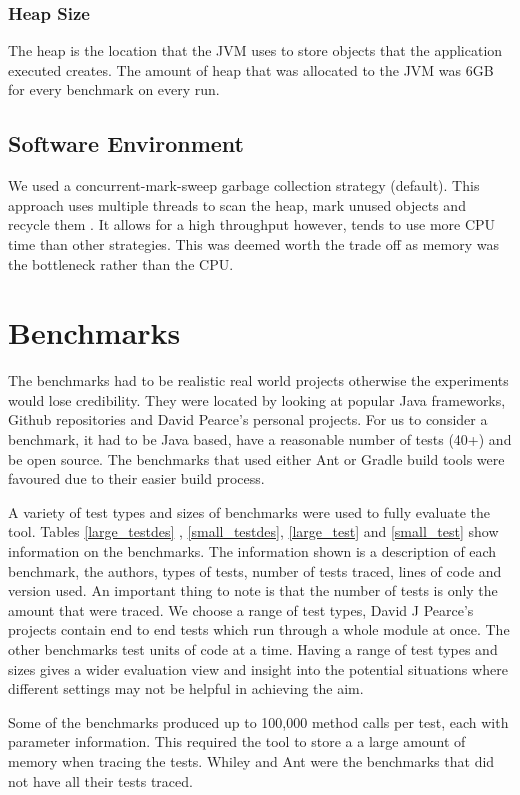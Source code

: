 \subsubsection{Heap Size}
The heap is the location that the JVM uses to store objects that the  application executed creates. The amount of heap that was allocated to the JVM was 6GB for every benchmark on every run.

\subsection{Software Environment}

We used a concurrent-mark-sweep garbage collection strategy (default). This approach uses multiple threads to scan the heap, mark unused objects and recycle them \cite{oracle2015}. It allows for a high throughput however, tends to use more CPU time than other strategies. This was deemed worth the trade off as memory was the bottleneck rather than the CPU.

\section{Benchmarks}
\label{S:bench}
The benchmarks had to be realistic real world projects otherwise the experiments would lose credibility. They were located by looking at popular Java frameworks, Github repositories and David Pearce's personal projects. For us to consider a benchmark, it had to be Java based, have a reasonable number of tests (40+) and be open source. The benchmarks that used either Ant or Gradle build tools were favoured due to their easier build process.

A variety of test types and sizes of benchmarks were used to fully evaluate the tool. Tables \ref{large_testdes} , \ref{small_testdes}, \ref{large_test} and \ref{small_test} show information on the benchmarks. The information shown is a description of each benchmark, the authors, types of tests, number of tests traced, lines of code and version used. An important thing to note is that the number of tests is only the amount that were traced. We choose a range of test types, David J Pearce's projects contain end to end tests which run through a whole module at once. The other benchmarks test units of code at a time. Having a range of test types and sizes gives a wider evaluation view and insight into the potential situations where different settings may not be helpful in achieving the aim.

Some of the benchmarks produced up to 100,000 method calls per test, each with parameter information. This required the tool to store a a large amount of memory when tracing the tests. Whiley and Ant were the benchmarks that did not have all their tests traced. 

